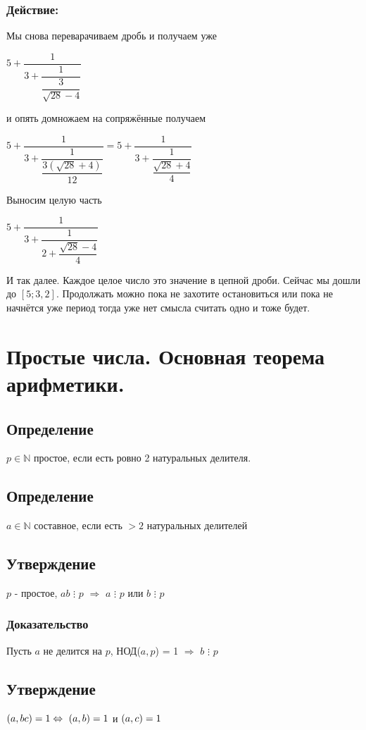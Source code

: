 \documentclass[12pt]{article}
\let\gcd\relax
\DeclareMathOperator{\gcd}{НОД}
\begin{document}
\subsubsection{Действие:}
Мы снова переварачиваем дробь и получаем уже\par
$5 + \dfrac{1}{3 + \dfrac{1}{\dfrac{3}{\sqrt{28}-4}}}$\par
\vspace{2 ex}
и опять домножаем на сопряжённые получаем\par
$5 + \dfrac{1}{3 + \dfrac{1}{\dfrac{3(\sqrt{28} + 4)}{12}}} = 5 + \dfrac{1}{3 + \dfrac{1}{\dfrac{\sqrt{28} + 4}{4}}}$\par
\vspace{2 ex}
Выносим целую часть\par
$5 + \dfrac{1}{3 + \dfrac{1}{2 + \dfrac{\sqrt{28} - 4}{4}}}$\par
\vspace{2 ex}
И так далее. Каждое целое число это значение в цепной дроби. Сейчас мы дошли до $[5;3,2]$. Продолжать можно пока не захотите остановиться или пока не начнётся уже период тогда уже нет смысла считать одно и тоже будет.

\section{Простые числа. Основная теорема арифметики.}
\subsection{Определение}
$p \in \mathbb{N}$ простое, если есть ровно 2 натуральных делителя.
\subsection{Определение}
$a \in \mathbb{N}$ составное, если есть $>2$ натуральных делителей
\subsection{Утверждение}
$p$ - простое, $ab$ $\vdots$ $p$ $\Rightarrow$ $a$ $\vdots$ $p$ или $b$ $\vdots$ $p$
\subsubsection{Доказательство}
Пусть $a$ не делится на $p$, НОД($a, p$) = 1 $\Rightarrow$ $b$ $\vdots$ $p$
\subsection{Утверждение}
$\gcd(a, bc) = 1 \Leftrightarrow \ \gcd(a, b) = 1$ и $\gcd(a, c) = 1$
\end{document}
